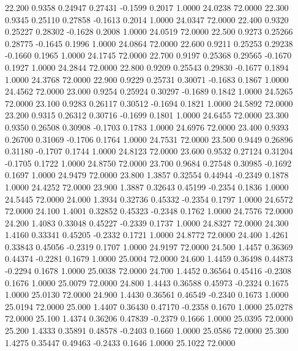   22.200   0.9358   0.24947   0.27431  -0.1599   0.2017   1.0000  24.0238  72.0000
  22.300   0.9345   0.25110   0.27858  -0.1613   0.2014   1.0000  24.0347  72.0000
  22.400   0.9320   0.25227   0.28302  -0.1628   0.2008   1.0000  24.0519  72.0000
  22.500   0.9273   0.25266   0.28775  -0.1645   0.1996   1.0000  24.0864  72.0000
  22.600   0.9211   0.25253   0.29238  -0.1660   0.1965   1.0000  24.1745  72.0000
  22.700   0.9197   0.25368   0.29565  -0.1670   0.1927   1.0000  24.2844  72.0000
  22.800   0.9209   0.25543   0.29830  -0.1677   0.1894   1.0000  24.3768  72.0000
  22.900   0.9229   0.25731   0.30071  -0.1683   0.1867   1.0000  24.4562  72.0000
  23.000   0.9254   0.25924   0.30297  -0.1689   0.1842   1.0000  24.5265  72.0000
  23.100   0.9283   0.26117   0.30512  -0.1694   0.1821   1.0000  24.5892  72.0000
  23.200   0.9315   0.26312   0.30716  -0.1699   0.1801   1.0000  24.6455  72.0000
  23.300   0.9350   0.26508   0.30908  -0.1703   0.1783   1.0000  24.6976  72.0000
  23.400   0.9393   0.26700   0.31069  -0.1706   0.1764   1.0000  24.7531  72.0000
  23.500   0.9449   0.26896   0.31180  -0.1707   0.1744   1.0000  24.8123  72.0000
  23.600   0.9532   0.27124   0.31204  -0.1705   0.1722   1.0000  24.8750  72.0000
  23.700   0.9684   0.27548   0.30985  -0.1692   0.1697   1.0000  24.9479  72.0000
  23.800   1.3857   0.32554   0.44944  -0.2349   0.1878   1.0000  24.4252  72.0000
  23.900   1.3887   0.32643   0.45199  -0.2354   0.1836   1.0000  24.5445  72.0000
  24.000   1.3934   0.32736   0.45332  -0.2354   0.1797   1.0000  24.6572  72.0000
  24.100   1.4001   0.32852   0.45323  -0.2348   0.1762   1.0000  24.7576  72.0000
  24.200   1.4083   0.33048   0.45227  -0.2339   0.1737   1.0000  24.8327  72.0000
  24.300   1.4160   0.33341   0.45205  -0.2332   0.1721   1.0000  24.8772  72.0000
  24.400   1.4261   0.33843   0.45056  -0.2319   0.1707   1.0000  24.9197  72.0000
  24.500   1.4457   0.36369   0.44374  -0.2281   0.1679   1.0000  25.0004  72.0000
  24.600   1.4459   0.36498   0.44873  -0.2294   0.1678   1.0000  25.0038  72.0000
  24.700   1.4452   0.36564   0.45416  -0.2308   0.1676   1.0000  25.0079  72.0000
  24.800   1.4443   0.36588   0.45973  -0.2324   0.1675   1.0000  25.0130  72.0000
  24.900   1.4430   0.36561   0.46549  -0.2340   0.1673   1.0000  25.0194  72.0000
  25.000   1.4407   0.36430   0.47170  -0.2358   0.1670   1.0000  25.0278  72.0000
  25.100   1.4374   0.36206   0.47839  -0.2379   0.1666   1.0000  25.0395  72.0000
  25.200   1.4333   0.35891   0.48578  -0.2403   0.1660   1.0000  25.0586  72.0000
  25.300   1.4275   0.35447   0.49463  -0.2433   0.1646   1.0000  25.1022  72.0000
